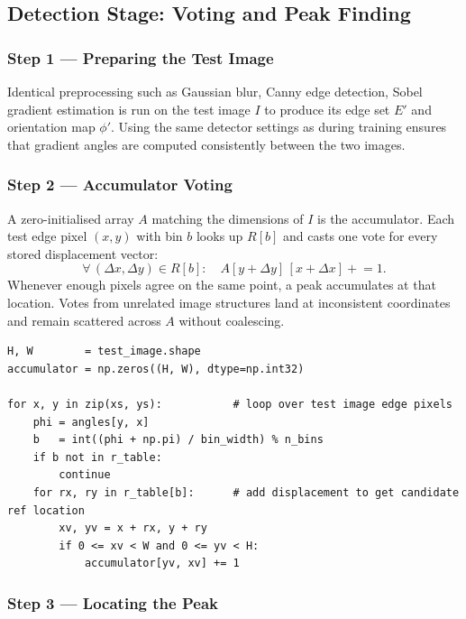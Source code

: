 \documentclass[12pt,a4paper]{article}
\begin{document}
\subsection{Detection Stage: Voting and Peak Finding}

\subsubsection*{Step 1 --- Preparing the Test Image}

Identical preprocessing such as Gaussian blur, Canny edge detection, Sobel gradient
estimation is run on the test image $I$ to produce its edge set $E'$ and
orientation map $\phi'$.  Using the same detector settings as during training ensures
that gradient angles are computed consistently between the two images.

\subsubsection*{Step 2 --- Accumulator Voting}

A zero-initialised array $A$ matching the dimensions of $I$ is the accumulator.
Each test edge pixel $(x, y)$ with bin $b$ looks up $R[b]$ and casts one vote for
every stored displacement vector:
\begin{equation}
  \forall\, (\Delta x, \Delta y) \in R[b]:\quad
  A[y + \Delta y]\,[x + \Delta x] \mathrel{+}= 1.
  \label{eq:voting}
\end{equation}
Whenever enough pixels agree on the same point, a
peak accumulates at that location.  Votes from unrelated image structures land at
inconsistent coordinates and remain scattered across $A$ without coalescing.

\begin{lstlisting}[caption={Accumulator voting: each edge pixel casts votes via its R-table bin.}]
H, W        = test_image.shape
accumulator = np.zeros((H, W), dtype=np.int32)

for x, y in zip(xs, ys):           # loop over test image edge pixels
    phi = angles[y, x]
    b   = int((phi + np.pi) / bin_width) % n_bins
    if b not in r_table:
        continue
    for rx, ry in r_table[b]:      # add displacement to get candidate ref location
        xv, yv = x + rx, y + ry
        if 0 <= xv < W and 0 <= yv < H:
            accumulator[yv, xv] += 1
\end{lstlisting}

\subsubsection*{Step 3 --- Locating the Peak}
\end{document}
